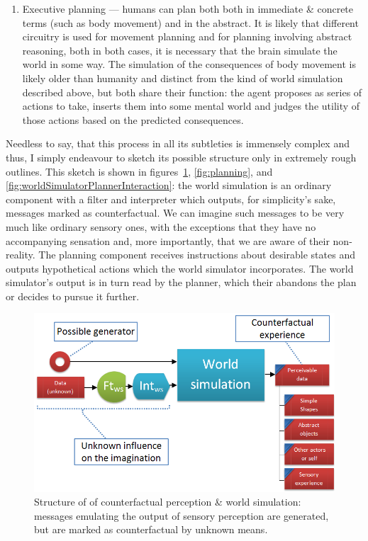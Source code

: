 \documentclass[]{scrartcl}
\begin{document}
\begin{enumerate}
	
	\item Executive planning --- humans can plan both both in immediate \& concrete terms (such as body movement) and in the abstract. It is likely that different circuitry is used for movement planning and for planning involving abstract reasoning, both in both cases, it is necessary that the brain simulate the world in some way. The simulation of the consequences of body movement is likely older than humanity and distinct from the kind of world simulation described above, but both share their function: the agent proposes as series of actions to take, inserts them into some mental world and judges the utility of those actions based on the predicted consequences.
\end{enumerate}

Needless to say, that this process in all its subtleties is immensely complex and thus, I simply endeavour to sketch its possible structure only in extremely rough outlines. This sketch is shown in figures~\ref{fig:imagination},  \ref{fig:planning}, and \ref{fig:worldSimulatorPlannerInteraction}: the world simulation is an ordinary component with a filter and interpreter which outputs, for simplicity's sake, messages marked as counterfactual. We can imagine such messages to be very much like ordinary sensory ones, with the exceptions that they have no accompanying sensation and, more importantly, that we are aware of their non-reality. The planning component receives instructions about desirable states and outputs hypothetical actions which the world simulator incorporates. The world simulator's output is in turn read by the planner, which their abandons the plan or decides to pursue it further.

\begin{figure}
	\centering
	\includegraphics[width=\textwidth]{figs/imagination.png}
	\caption{Structure of of counterfactual perception \& world simulation: messages emulating the output of sensory perception are generated, but are marked as counterfactual by unknown means.}
	\label{fig:imagination}
\end{figure}
\end{document}
